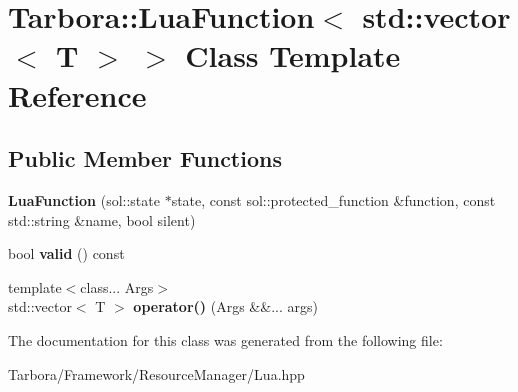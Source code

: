 \hypertarget{classTarbora_1_1LuaFunction_3_01std_1_1vector_3_01T_01_4_01_4}{}\section{Tarbora\+:\+:Lua\+Function$<$ std\+:\+:vector$<$ T $>$ $>$ Class Template Reference}
\label{classTarbora_1_1LuaFunction_3_01std_1_1vector_3_01T_01_4_01_4}
\subsection*{Public Member Functions}
\begin{DoxyCompactItemize}
\item 
\mbox{\label{classTarbora_1_1LuaFunction_3_01std_1_1vector_3_01T_01_4_01_4_ab83581d0db66993d733ba6df2f0b550a}} 
{\bfseries Lua\+Function} (sol\+::state $\ast$state, const sol\+::protected\+\_\+function \&function, const std\+::string \&name, bool silent)
\item 
\mbox{\label{classTarbora_1_1LuaFunction_3_01std_1_1vector_3_01T_01_4_01_4_aa0bb340fcd4e0598acfd1f98a534cb96}} 
bool {\bfseries valid} () const
\item 
\mbox{\label{classTarbora_1_1LuaFunction_3_01std_1_1vector_3_01T_01_4_01_4_a200134fef7b06174b2c1cd3037292686}} 
{\footnotesize template$<$class... Args$>$ }\\std\+::vector$<$ T $>$ {\bfseries operator()} (Args \&\&... args)
\end{DoxyCompactItemize}


The documentation for this class was generated from the following file\+:\begin{DoxyCompactItemize}
\item 
Tarbora/\+Framework/\+Resource\+Manager/Lua.\+hpp\end{DoxyCompactItemize}
